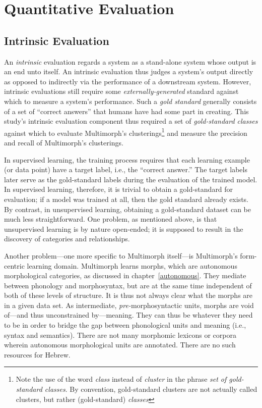 \section{Quantitative Evaluation}
\subsection{Intrinsic Evaluation}
\label{sec:intrinsic}
An \emph{intrinsic} evaluation regards a system as a stand-alone system whose output is an end unto itself. An intrinsic evaluation thus judges a system's output directly as opposed to indirectly via the performance of a downstream system. However, intrinsic evaluations still require some \emph{externally-generated} standard against which to measure a system's performance. Such a \emph{gold standard} generally consists of a set of ``correct answers'' that humans have had some part in creating.
This study's intrinsic evaluation component thus required a 
set of \emph{gold-standard classes} against which to evaluate 
Multimorph's clusterings\footnote{Note the use of the word \emph{class} 
instead of \emph{cluster} in the phrase \emph{set of gold-standard classes}. 
By convention, gold-standard clusters are not actually called clusters, but rather 
(gold-standard) \emph{classes}} and measure the precision 
and recall of Multimorph's clusterings. 

In supervised learning, the training process requires that each learning example 
(or data point) have a target label, i.e., the ``correct answer.'' The target labels 
later serve as the gold-standard labels during the evaluation of the trained model. 
In supervised learning, therefore, it is trivial to obtain a gold-standard 
for evaluation; if a model was trained at all, then the gold standard 
already exists. By contrast, in unsupervised learning, obtaining a gold-standard 
dataset can be much less straightforward. One problem, as mentioned above, 
is that unsupervised learning is by nature open-ended; it is 
supposed to result in the discovery of categories and relationships.  

Another problem---one more specific to Multimorph 
itself---is
Multimorph's form-centric learning domain. Multimorph learns morphs, 
which are autonomous morphological categories, as discussed in chapter~\ref{autonomous}. 
They mediate between phonology and morphosyntax, but are at the same time independent 
of both of these levels of structure. It is thus not always clear what the morphs are in a 
given data set. As intermediate, \emph{pre-}morphosyntactic units, morphs are void 
of---and thus unconstrained by---meaning. They can thus
be whatever they need to be in order to bridge the gap between phonological units 
and meaning (i.e., syntax and semantics).  There are not many morphomic lexicons 
or corpora wherein autonomous morphological units are annotated. There are no 
such resources for Hebrew.

